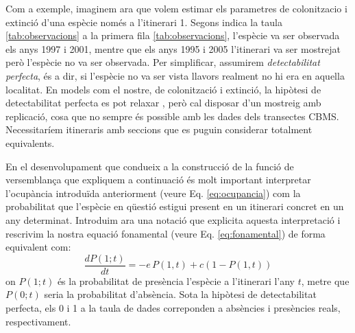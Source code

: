 \documentclass{article}
\begin{document}
Com a exemple, imaginem ara que volem estimar els parametres de colonitzacio i extinci\'o d'una esp\`ecie nom\'es a l'itinerari 1. Segons indica la taula \ref{tab:observacions} a la primera fila \ref{tab:observacions}, l'esp\`ecie va ser observada els anys 1997 i 2001, mentre que els anys 1995 i 2005 l'itinerari va ser mostrejat per\`o l'esp\`ecie no va ser observada. Per simplificar, assumirem {\it detectabilitat perfecta}, \'es a dir, si l'esp\`ecie no va ser vista llavors realment no hi era en aquella localitat. En models com el nostre, de colonitzaci\'o i extinci\'o, la hip\`otesi de detectabilitat perfecta es pot relaxar \cite{MacKenzie03}, per\`o cal disposar d'un mostreig amb replicaci\'o, cosa que no sempre \'es possible amb les dades dels transectes CBMS. Necessitar\'iem itineraris amb seccions que es puguin considerar totalment equivalents.
\smallskip

En el desenvolupament que condueix a la construcci\'o de la funci\'o de versemblan\c{c}a que expliquem a continuaci\'o \'es molt important interpretar l'ocup\`ancia introdu\"ida anteriorment (veure Eq. \ref{eq:ocupancia}) com la probabilitat que l'esp\`ecie en q\"uesti\'o estigui present en un itinerari concret en un any determinat. Introduim ara una notaci\'o que explicita aquesta interpretaci\'o i rescrivim la nostra equaci\'o fonamental (veure Eq. \ref{eq:fonamental}) de forma equivalent com: 
\begin{equation}
  \frac{dP(1;t)}{dt}=-e\, P(1,t)+c(1-P(1,t))
  \label{eq:fonamental_Bis}
\end{equation}
on $P(1;t)$ \'es la probabilitat de pres\`encia l'esp\`ecie a l'itinerari l'any $t$, metre que $P(0;t)$ seria la probabilitat d'abs\`encia. Sota la hip\`otesi de detectabilitat perfecta, els 0 i 1 a la taula de dades correponden a abs\`encies i pres\`encies reals, respectivament. 
\smallskip
\end{document}
